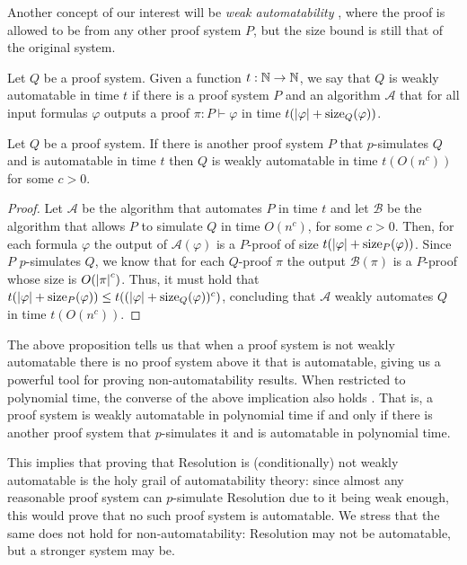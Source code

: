 Another concept of our interest will be \textit{weak automatability} \cite{resk_weakauto, pudlak_upper}, where the proof is allowed to be from any other proof system $P$, but the size bound is still that of the original system.

\begin{definition}
    Let $Q$ be a proof system. Given a function $t : \mathbb{N} \to \mathbb{N}$, we say that $Q$ is weakly automatable in time $t$ if there is a proof system $P$ and an algorithm $\mathcal{A}$ that for all input formulas $\varphi$ outputs a proof $\pi : P \vdash \varphi$ in time $t(\left|\varphi\right| + \mathrm{size}_Q(\varphi))$.
\end{definition}

\begin{proposition}
    Let $Q$ be a proof system. If there is another proof system $P$ that $p$-simulates $Q$ and is automatable in time $t$ then $Q$ is weakly automatable in time $t(O(n^c))$ for some $c > 0$.
\end{proposition}

\begin{proof}
    Let $\mathcal{A}$ be the algorithm that automates $P$ in time $t$ and let $\mathcal{B}$ be the algorithm that allows $P$ to simulate $Q$ in time $O(n^c)$, for some $c > 0$. Then, for each formula $\varphi$ the output of $\mathcal{A}(\varphi)$ is a $P$-proof of size $t(\left|\varphi\right| + \mathrm{size}_{P}(\varphi))$. Since $P$ $p$-simulates $Q$, we know that for each $Q$-proof $\pi$ the output $\mathcal{B}(\pi)$ is a $P$-proof whose size is $O(\left|\pi\right|^c)$. Thus, it must hold that $t(\left|\varphi\right| + \mathrm{size}_{P}(\varphi)) \leq t((\left|\varphi\right| + \mathrm{size}_{Q}(\varphi))^c)$, concluding that $\mathcal{A}$ weakly automates $Q$ in time $t(O(n^c))$.
\end{proof}

The above proposition tells us that when a proof system is not weakly automatable there is no proof system above it that is automatable, giving us a powerful tool for proving non-automatability results. When restricted to polynomial time, the converse of the above implication also holds \cite{resk_weakauto,pudlak_upper}. That is, a proof system is weakly automatable in polynomial time if and only if there is another proof system that $p$-simulates it and is automatable in polynomial time.

This implies that proving that Resolution is (conditionally) not weakly automatable is the holy grail of automatability theory: since almost any reasonable proof system can $p$-simulate Resolution due to it being weak enough, this would prove that no such proof system is automatable. We stress that the same does not hold for non-automatability: Resolution may not be automatable, but a stronger system may be. 

